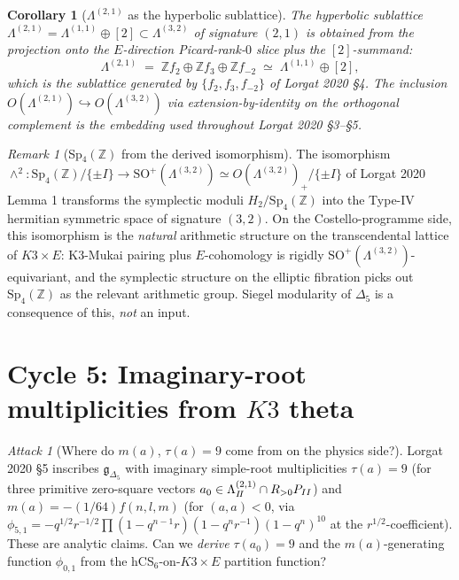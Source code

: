 \documentclass[11pt]{amsart}
\providecommand{\R}{\mathbb{R}}
\providecommand{\Z}{\mathbb{Z}}
\providecommand{\HB}{\Lambda^{(2,1)}_{I\!I}}
\providecommand{\HA}{\Lambda^{(2,1)}}
\providecommand{\LamF}{\Lambda^{(3,2)}}
\providecommand{\Gdelta}{\mathfrak{g}_{\Delta_{5}}}
\theoremstyle{plain}
\newtheorem{corollary}[theorem]{Corollary}
\theoremstyle{definition}
\theoremstyle{remark}
\newtheorem{remark}[theorem]{Remark}
\newtheorem{attack}[theorem]{Attack}
\begin{document}
\begin{corollary}[$\HA$ as the hyperbolic sublattice]
\label{cor:HA-from-geometry}
The hyperbolic sublattice $\HA = \Lambda^{(1,1)}\oplus [2]\subset\LamF$
of signature $(2,1)$ is obtained from the projection onto the
$E$-direction Picard-rank-$0$ slice plus the $[2]$-summand:
\[
\HA \;=\; \Z f_{2} \oplus \Z f_{3}\oplus \Z f_{-2}
\;\simeq\; \Lambda^{(1,1)}\oplus [2],
\]
which is the sublattice generated by $\{f_{2}, f_{3}, f_{-2}\}$ of
Lorgat 2020 \S4. The inclusion $O(\HA)\hookrightarrow O(\LamF)$ via
extension-by-identity on the orthogonal complement is the embedding
used throughout Lorgat 2020 \S3--\S5.
\end{corollary}

\begin{remark}[Sp$_{4}(\Z)$ from the derived isomorphism]
\label{rem:Sp4-from-Lambda32}
The isomorphism $\wedge^{2}: \mathrm{Sp}_{4}(\Z)/\{\pm I\} \to
\mathrm{SO}^{+}(\Lambda^{(3,2)}) \simeq O(\Lambda^{(3,2)})_{+}/\{\pm I\}$
of Lorgat 2020 Lemma 1 transforms the symplectic moduli
$H_{2}/\mathrm{Sp}_{4}(\Z)$ into the Type-IV hermitian symmetric space
of signature $(3,2)$. On the Costello-programme side, this isomorphism
is the \emph{natural} arithmetic structure on the transcendental lattice
of $K3\times E$: K3-Mukai pairing plus $E$-cohomology is rigidly
$\mathrm{SO}^{+}(\Lambda^{(3,2)})$-equivariant, and the symplectic
structure on the elliptic fibration picks out $\mathrm{Sp}_{4}(\Z)$
as the relevant arithmetic group. Siegel modularity of $\Delta_{5}$
is a consequence of this, \emph{not} an input.
\end{remark}

\section{Cycle 5: Imaginary-root multiplicities from $K3$ theta}

\begin{attack}[Where do $m(a)$, $\tau(a) = 9$ come from on the
physics side?]\label{atk:5}
Lorgat 2020 \S5 inscribes $\Gdelta$ with imaginary simple-root
multiplicities $\tau(a) = 9$ (for three primitive zero-square vectors
$a_{0}\in\HB\cap\R_{>0}\cP_{II}$) and $m(a) = -(1/64)f(n,l,m)$ (for
$(a,a)<0$, via $\phi_{5,1}=-q^{1/2}r^{-1/2}\prod(1-q^{n-1}r)(1-q^{n}r^{-1})(1-q^{n})^{10}$
at the $r^{1/2}$-coefficient). These are analytic claims. Can we
\emph{derive} $\tau(a_{0}) = 9$ and the $m(a)$-generating function
$\phi_{0,1}$ from the hCS$_{6}$-on-$K3\times E$ partition function?
\end{attack}
\end{document}
